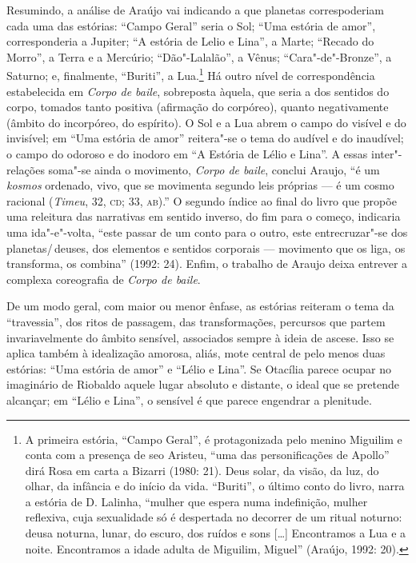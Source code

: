 {Resumindo, a análise de Araújo vai indicando a que planetas
correspoderiam cada uma das estórias: “Campo Geral” seria o Sol; “Uma
estória de amor”, corresponderia a Jupiter; “A estória de Lelio e
Lina”, a Marte; “Recado do Morro”, a Terra e a Mercúrio;
“Dão"-Lalalão”, a Vênus; “Cara"-de"-Bronze”, a Saturno; e, finalmente,
“Buriti”, a Lua.\footnote{ A primeira estória, “Campo Geral”, é
protagonizada pelo menino Miguilim e conta com a presença de seo
Aristeu, “uma das personificações de Apollo” dirá Rosa em carta a
Bizarri (1980: 21). Deus solar, da visão, da luz, do olhar, da
infância e do início da vida. “Buriti”, o último conto do livro,
narra a estória de D. Lalinha, “mulher que espera numa indefinição,
mulher reflexiva, cuja sexualidade só é despertada no decorrer de um
ritual noturno: deusa noturna, lunar, do escuro, dos ruídos e sons
[\ldots{}] Encontramos a Lua e a noite. Encontramos a idade adulta de
Miguilim, Miguel” (Araújo, 1992: 20).  }  Há outro nível de
correspondência estabelecida em \emph{Corpo de baile}, sobreposta
àquela, que seria a dos sentidos do corpo, tomados tanto positiva
(afirmação do corpóreo), quanto negativamente (âmbito do incorpóreo,
do espírito). O Sol e a Lua abrem o campo do visível e do invisível;
em “Uma estória de amor” reitera"-se o tema do audível e do inaudível;
o campo do odoroso e do inodoro em “A Estória de Lélio e Lina”. A
essas inter"-relações soma"-se ainda o movimento, \emph{Corpo de
baile}, conclui Araujo, “é um \emph{kosmos} ordenado, vivo, que se
movimenta segundo leis próprias --- é um cosmo racional
(\emph{Timeu}, 32, \textsc{cd}; 33, \textsc{ab}).” O segundo índice ao final do livro
que propõe uma releitura das narrativas em sentido inverso, do fim
para o começo, indicaria uma ida"-e"-volta, “este passar de um conto
para o outro, este entrecruzar"-se dos planetas/\,deuses, dos elementos
e sentidos corporais --- movimento que os liga, os transforma, os
combina” (1992: 24). Enfim, o trabalho de Araujo deixa entrever a
complexa coreografia de \emph{Corpo de baile}.

De um modo geral, com maior ou menor ênfase, as estórias reiteram o
tema da “travessia”, dos ritos de passagem, das transformações,
percursos que partem invariavelmente do âmbito sensível, associados
sempre à ideia de ascese. Isso se aplica também à idealização
amorosa, aliás, mote central de pelo menos duas estórias: “Uma
estória de amor” e “Lélio e Lina”. Se Otacília parece ocupar no
imaginário de Riobaldo aquele lugar absoluto e distante, o ideal que
se pretende alcançar; em “Lélio e Lina”, o sensível é que parece
engendrar a plenitude.

}

